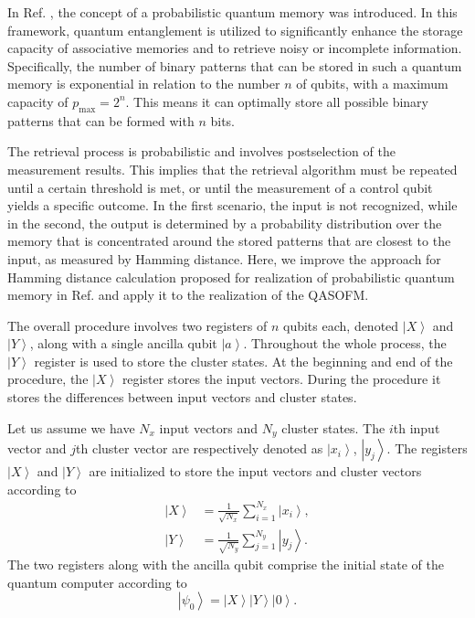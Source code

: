 \documentclass[%
  pra, aps, physrev,
  showkeys,
  twocolumn,
  showpacs,
  superscriptaddress,
  amsmath,amssymb,
  10pt
]{revtex4-2}
\begin{document}
In Ref. \cite{trugenberger2001}, the concept of a probabilistic quantum memory was introduced. In this framework, quantum entanglement is utilized to significantly enhance the storage capacity of associative memories and to retrieve noisy or incomplete information. Specifically, the number of binary patterns that can be stored in such a quantum memory is exponential in relation to the number $ n $ of qubits, with a maximum capacity of $ p_{\text{max}} = 2^n $. This means it can optimally store all possible binary patterns that can be formed with $ n $ bits.

The retrieval process is probabilistic and involves postselection of the measurement results. This implies that the retrieval algorithm must be repeated until a certain threshold is met, or until the measurement of a control qubit yields a specific outcome. In the first scenario, the input is not recognized, while in the second, the output is determined by a probability distribution over the memory that is concentrated around the stored patterns that are closest to the input, as measured by Hamming distance. Here, we improve the approach for Hamming distance calculation proposed for realization of probabilistic quantum memory in Ref. \cite{trugenberger2001} and apply it to the realization of the QASOFM.


The overall procedure involves two registers of $n$ qubits each, denoted $\left| X \right\rangle$ and $\left| Y \right\rangle$, along with a single ancilla qubit $\left| a \right\rangle$.
Throughout the whole process, the $\left| Y \right\rangle$ register is used to store the cluster states.
At the beginning and end of the procedure, the $\left| X \right\rangle$ register stores the input vectors.
During the procedure it stores the differences between input vectors and cluster states.

Let us assume we have $N_x$ input vectors and $N_y$ cluster states.
The $i$th input vector and $j$th cluster vector are respectively denoted as $\left| x_i \right\rangle$, $\left| y_j \right\rangle$.
The registers $\left| X \right\rangle$ and $\left| Y \right\rangle$ are initialized to store the input vectors and cluster vectors according to
%
\begin{align}
    \label{eq:encodnig}
    \left| X \right\rangle  & = \frac{1}{\sqrt{N_x}} \sum\limits_{i=1}^{N_x} \left| x_i \right\rangle,  \\
    \left| Y \right\rangle&  = \frac{1}{\sqrt{N_y}} \sum\limits_{j=1}^{N_y} \left| y_j \right\rangle .
\end{align}
%
The two registers along with the ancilla qubit comprise the initial state of the quantum computer according to
%
\begin{equation}
    \label{eq:initial_state}
  \left| \psi_0 \right\rangle =
    \left| X \right\rangle
    \left| Y \right\rangle
    \left| 0 \right\rangle.
\end{equation}
\end{document}
